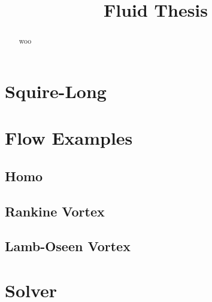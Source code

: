 \documentclass{X:/Documents/Coding/Latex/myreport}
\title{Fluid Thesis}
\begin{document}
\maketitle
\begin{abstract}
	woo
\end{abstract}

\chapter{Squire-Long}
\chapter{Flow Examples}
\section{Homo}
\section{Rankine Vortex}
\section{Lamb-Oseen Vortex}

\chapter{Solver}
\end{document}
